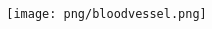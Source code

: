 \begin{frame}

  \begin{columns}

    \begin{column}{0.75\textwidth}
      \titlepage
    \end{column}

    \begin{column}{0.25\textwidth}
      \begin{center}
        \texttt{[image: png/bloodvessel.png]}
      \end{center}
    \end{column}

  \end{columns}

\end{frame}
